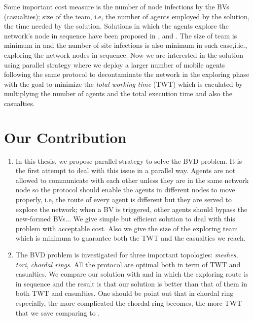 Some important cost measure is the number of node infections by the BVs (casualties); size of the team, i.e, the number of agents employed by the solution, the time needed by the solution. 
    Solutions in which the agents explore the network's node in sequence have been proposed in \cite{Cai}, \cite{Alotaibi} and \cite{ Cai1}. The size of team is minimum in \cite{Cai} and the number of site infections is also minimum in such case,i.ie., exploring the network nodes in sequence. Now we are interested in the solution using parallel strategy where we deploy a larger number of mobile agents following the same protocol to decontaminate the network in the exploring phase with the goal to minimize the {\em total working time} (TWT) which is caculated by multiplying the number of agents and the total execution time and also the casualties.


\section{Our Contribution} 


\begin{enumerate}
\item In this thesis, we propose parallel strategy to solve the BVD problem. It is the first attempt to deal with this issue in a parallel way. Agents are not allowed to communicate with each other unless they are in the same network node so the protocol should enable the agents in different nodes to move properly, i.e, the route of every agent is different but they are served to explore the network; when a BV is triggered, other agents should bypass the new-formed BVs... We give simple but efficient solution to deal with this problem with acceptable cost. Also we give the size of the exploring team which is minimum to guarantee both the TWT and the  casualties we reach.
\item The BVD problem is investigated for three important topologies: {\em meshes}, {\em tori}, {\em chordal rings}. All the protocol are optimal both in term of TWT and casualties. We compare our solution with \cite{Cai} and \cite{Alotaibi} in which the exploring route is in sequence and the result is that our solution is better than that of them in both TWT and casualties. One should be point out that in chordal ring especially, the more complicated the chordal ring becomes, the more TWT that we save comparing to \cite{Alotaibi}.
\end{enumerate}

